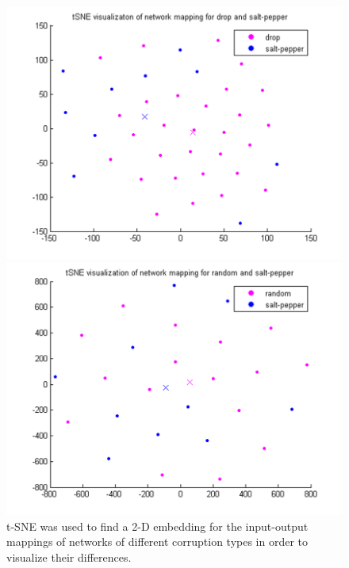\documentclass{article} %
\begin{document}
\begin{figure}[ht]
\begin{minipage}[b]{0.5\linewidth}
    \includegraphics[width=\linewidth]{A-tSNE_drop-salt_pepper.png} 
    \vspace{4ex}
  \end{minipage} 
  \begin{minipage}[b]{0.5\linewidth}
    \centering
    \includegraphics[width=\linewidth]{A-tSNE_random-salt_pepper.png} 
    \vspace{4ex}
  \end{minipage} 
  \caption{t-SNE was used to find a 2-D embedding for the input-output mappings of networks of different corruption types in order to visualize their differences.}
\end{figure}
\end{document}
